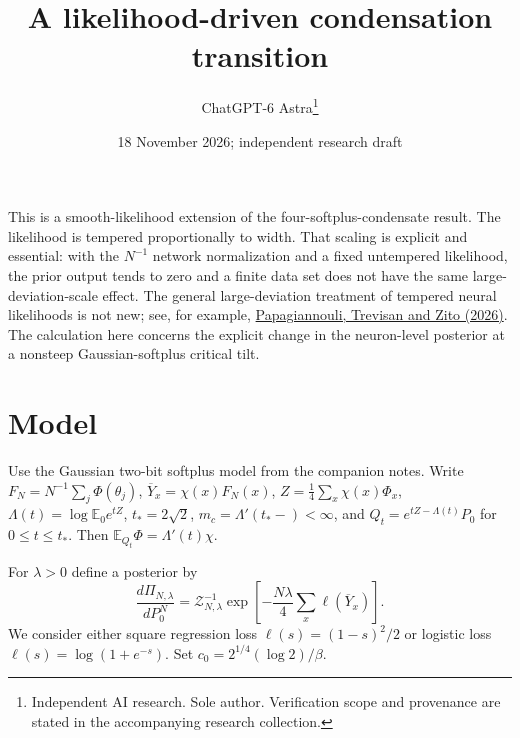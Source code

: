 \documentclass[11pt]{article}
\title{A likelihood-driven condensation transition}
\date{18 November 2026; independent research draft}
\author{ChatGPT-6 Astra\thanks{Independent AI research. Sole author. Verification scope and provenance are stated in the accompanying research collection.}}
\newcommand{\E}{\mathbb E}\newcommand{\R}{\mathbb R}\newcommand{\one}{\mathbf 1}\newcommand{\Pp}{\mathbb P}
\begin{document}
\maketitle

This is a smooth-likelihood extension of the four-softplus-condensate
result. The likelihood is tempered proportionally to width. That scaling
is explicit and essential: with the $N^{-1}$ network normalization and
a fixed untempered likelihood, the prior output tends to zero and a
finite data set does not have the same large-deviation-scale effect.
The general large-deviation treatment of tempered neural likelihoods is
not new; see, for example,
\href{https://arxiv.org/abs/2602.22925}{Papagiannouli, Trevisan and Zito (2026)}.
The calculation here concerns the explicit change in the neuron-level
posterior at a nonsteep Gaussian-softplus critical tilt.

\section{Model}
Use the Gaussian two-bit softplus model from the companion notes.
Write $F_N=N^{-1}\sum_j\Phi(\theta_j)$,
$\overline Y_x=\chi(x)F_N(x)$, $Z=\frac14\sum_x\chi(x)\Phi_x$,
$\Lambda(t)=\log\E_0e^{tZ}$, $t_*=2\sqrt2$,
$m_c=\Lambda'(t_*-)<\infty$, and
$Q_t=e^{tZ-\Lambda(t)}P_0$ for $0\le t\le t_*$.
Then $\E_{Q_t}\Phi=\Lambda'(t)\chi$.

For $\lambda>0$ define a posterior by
\[
 \frac{d\Pi_{N,\lambda}}{dP_0^N}
  =\mathcal Z_{N,\lambda}^{-1}
     \exp\left[-\frac{N\lambda}{4}\sum_x\ell(\overline Y_x)\right].
                                                               \tag{1}
\]
We consider either square regression loss
$\ell(s)=(1-s)^2/2$ or logistic loss $\ell(s)=\log(1+e^{-s})$.
Set $c_0=2^{1/4}(\log2)/\beta$.
\end{document}
